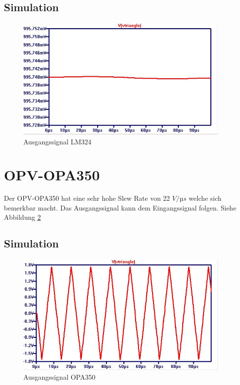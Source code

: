 \documentclass[11pt,a4paper,bibtotoc,oneside]{scrbook}
\begin{document}
\subsection{Simulation}
    \begin{figure}[h]
    \centering
        \includegraphics[width=300pt]{./picture/LM324_triangle.png}
        \caption{\label{lm324}{Ausgangssignal LM324}}
    \end{figure}
\section{OPV-OPA350}
Der OPV-OPA350 hat eine sehr hohe Slew Rate von 22 $V/µs$ welche sich bemerkbar macht. Das Ausgangssignal kann dem
Eingangssignal folgen. Siehe Abbildung \textcolor{blue}{\ref{opa324}}
\subsection{Simulation}
\begin{figure}[h]
\centering
    \includegraphics[width=300pt]{./picture/OPA350_triangle.png}
    \caption{\label{opa324}Ausgangssignal OPA350}
\end{figure}
\end{document}
